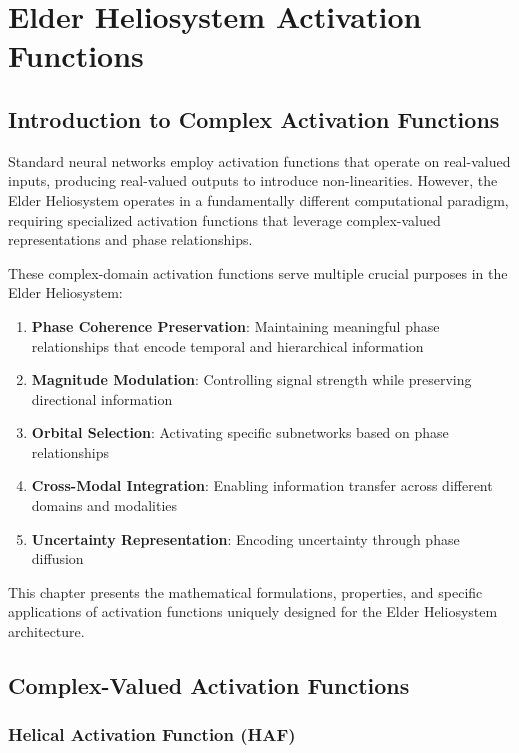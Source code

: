 \chapter{Elder Heliosystem Activation Functions}

\section{Introduction to Complex Activation Functions}

Standard neural networks employ activation functions that operate on real-valued inputs, producing real-valued outputs to introduce non-linearities. However, the Elder Heliosystem operates in a fundamentally different computational paradigm, requiring specialized activation functions that leverage complex-valued representations and phase relationships.

These complex-domain activation functions serve multiple crucial purposes in the Elder Heliosystem:

\begin{enumerate}
    \item \textbf{Phase Coherence Preservation}: Maintaining meaningful phase relationships that encode temporal and hierarchical information
    \item \textbf{Magnitude Modulation}: Controlling signal strength while preserving directional information
    \item \textbf{Orbital Selection}: Activating specific subnetworks based on phase relationships
    \item \textbf{Cross-Modal Integration}: Enabling information transfer across different domains and modalities
    \item \textbf{Uncertainty Representation}: Encoding uncertainty through phase diffusion
\end{enumerate}

This chapter presents the mathematical formulations, properties, and specific applications of activation functions uniquely designed for the Elder Heliosystem architecture.

\section{Complex-Valued Activation Functions}

\subsection{Helical Activation Function (HAF)}

